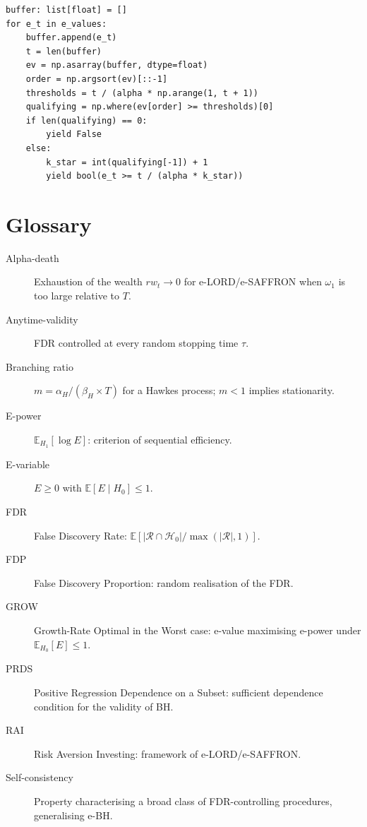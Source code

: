 \documentclass[11pt,a4paper]{article}
\theoremstyle{plain}
\theoremstyle{definition}
\theoremstyle{remark}
\newcommand{\E}{\mathbb{E}}
\begin{document}
\begin{lstlisting}[caption={Offline e-BH recomputed at each step.}]
buffer: list[float] = []
for e_t in e_values:
    buffer.append(e_t)
    t = len(buffer)
    ev = np.asarray(buffer, dtype=float)
    order = np.argsort(ev)[::-1]
    thresholds = t / (alpha * np.arange(1, t + 1))
    qualifying = np.where(ev[order] >= thresholds)[0]
    if len(qualifying) == 0:
        yield False
    else:
        k_star = int(qualifying[-1]) + 1
        yield bool(e_t >= t / (alpha * k_star))
\end{lstlisting}

\section{Glossary}
\label{ann:glossaire}

\begin{description}
  \item[Alpha-death] Exhaustion of the wealth $rw_t \to 0$ for e-LORD/e-SAFFRON
    when $\omega_1$ is too large relative to $T$.
  \item[Anytime-validity] FDR controlled at every random stopping time
    $\tau$.
  \item[Branching ratio] $m = \alpha_H / (\beta_H \times T)$ for a Hawkes
    process; $m < 1$ implies stationarity.
  \item[E-power] $\E_{H_1}[\log E]$: criterion of sequential efficiency.
  \item[E-variable] $E \ge 0$ with $\E[E \mid H_0] \le 1$.
  \item[FDR] False Discovery Rate: $\E[|\mathcal{R}\cap\mathcal{H}_0| / \max(|\mathcal{R}|,1)]$.
  \item[FDP] False Discovery Proportion: random realisation of the FDR.
  \item[GROW] Growth-Rate Optimal in the Worst case: e-value maximising
    e-power under $\E_{H_0}[E] \le 1$.
  \item[PRDS] Positive Regression Dependence on a Subset: sufficient
    dependence condition for the validity of BH.
  \item[RAI] Risk Aversion Investing: framework of e-LORD/e-SAFFRON.
  \item[Self-consistency] Property characterising a broad class of
    FDR-controlling procedures, generalising e-BH.
\end{description}
\end{document}
